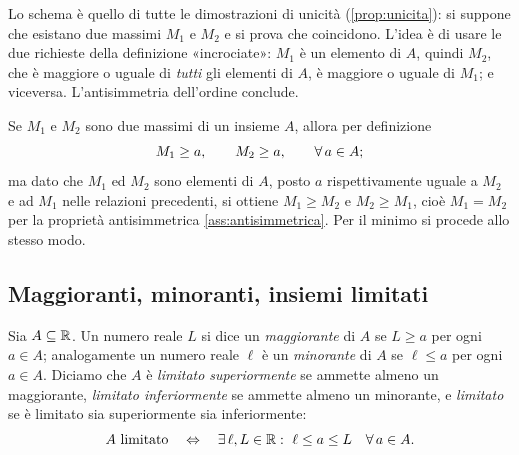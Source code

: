 \begin{schema}
\end{schema}

\begin{strategia}
Lo schema è quello di tutte le dimostrazioni di unicità (\cref{prop:unicita}): si
suppone che esistano due massimi $M_{1}$ e $M_{2}$ e si prova che coincidono. L'idea è
di usare le due richieste della definizione «incrociate»: $M_{1}$ è un elemento di $A$,
quindi $M_{2}$, che è maggiore o uguale di \emph{tutti} gli elementi di $A$, è maggiore
o uguale di $M_{1}$; e viceversa. L'antisimmetria dell'ordine conclude.
\end{strategia}

\begin{dimostrazione}
Se $M_{1}$ e $M_{2}$ sono due massimi di un insieme $A$, allora per definizione
\[
  M_{1}\ge a, \qquad M_{2}\ge a, \qquad \forall\, a\in A;
\]
ma dato che $M_{1}$ ed $M_{2}$ sono elementi di $A$, posto $a$ rispettivamente uguale a
$M_{2}$ e ad $M_{1}$ nelle relazioni precedenti, si ottiene $M_{1}\ge M_{2}$ e
$M_{2}\ge M_{1}$, cioè $M_{1}=M_{2}$ per la proprietà antisimmetrica
\ref{ass:antisimmetrica}. Per il minimo si procede allo stesso modo.
\end{dimostrazione}

\subsection{Maggioranti, minoranti, insiemi limitati}

\begin{definizione}
Sia $A\subseteq\mathbb{R}$. Un numero reale $L$ si dice un \emph{maggiorante} di $A$ se $L\ge a$
per ogni $a\in A$; analogamente un numero reale $\ell$ è un \emph{minorante} di $A$ se
$\ell\le a$ per ogni $a\in A$. Diciamo che $A$ è \emph{limitato superiormente} se ammette
almeno un maggiorante, \emph{limitato inferiormente} se ammette almeno un minorante, e
\emph{limitato} se è limitato sia superiormente sia inferiormente:
\begin{equation}\label{eq:limitato}
  A \text{ limitato} \quad\Leftrightarrow\quad \exists\, \ell,L\in\mathbb{R} : \ \ell\le a\le L \quad \forall\, a\in A.
\end{equation}
\end{definizione}

